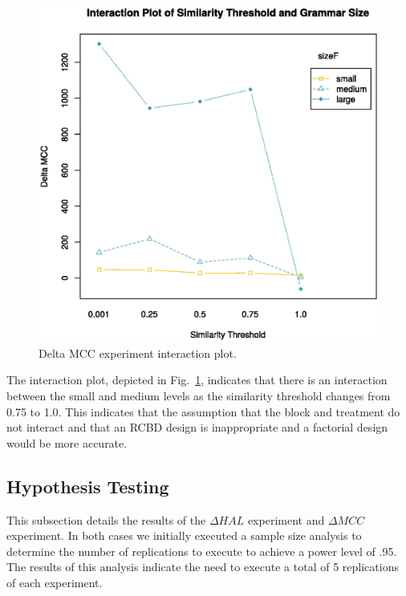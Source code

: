 \documentclass[conference]{IEEEtran}
\begin{document}
\begin{figure}
\hypertarget{fig:ex2_interaction}{%
\centering
\includegraphics{images/paper/results/ex2_interaction.eps}
\caption{Delta MCC experiment interaction
plot.}\label{fig:ex2_interaction}
}
\end{figure}

The interaction plot, depicted in Fig.~\ref{fig:ex2_interaction},
indicates that there is an interaction between the small and medium
levels as the similarity threshold changes from 0.75 to 1.0. This
indicates that the assumption that the block and treatment do not
interact and that an RCBD design is inappropriate and a factorial design
would be more accurate.

\hypertarget{sec:hyp_tests}{%
\subsection{Hypothesis Testing}\label{sec:hyp_tests}}

This subsection details the results of the \(\Delta HAL\) experiment and
\(\Delta MCC\) experiment. In both cases we initially executed a sample
size analysis to determine the number of replications to execute to
achieve a power level of .95. The results of this analysis indicate the
need to execute a total of 5 replications of each experiment.
\end{document}
